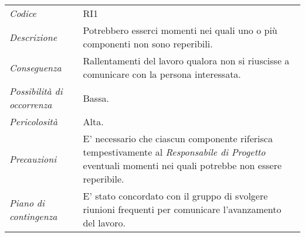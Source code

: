 {{{{{{{{{{{\def\tabularxcolumn#1{m{#1}}
{

	\begin{center}
		\renewcommand{\arraystretch}{1.4}

		\begin{longtable}{|p{5cm}|p{12cm}|}
			\hline
			\rowcolor{airforceblue}
			\multicolumn{2}{|c|}{\textit{Comunicazione interna}}\\
			\hline
			\textit{Codice} & RI1 \\
			\hline
			\textit{Descrizione} & Potrebbero esserci momenti nei quali uno o più componenti non sono reperibili. \\
			\hline
			\textit{Conseguenza} & Rallentamenti del lavoro qualora non si riuscisse a comunicare con la persona interessata. \\
			\hline
			\textit{Possibilità di occorrenza} & Bassa. \\
			\hline
			\textit{Pericolosità} & Alta. \\
			\hline
			\textit{Precauzioni} & E' necessario che ciascun componente riferisca tempestivamente al \textit{Responsabile di Progetto} eventuali momenti nei quali potrebbe non essere reperibile. \\
			\hline
			\textit{Piano di contingenza} & E' stato concordato con il gruppo di svolgere riunioni frequenti per comunicare l'avanzamento del lavoro.\\
			\hline
		\end{longtable}
	\end{center}

\def\tabularxcolumn#1{m{#1}}
{
	
	\begin{center}
		\renewcommand{\arraystretch}{1.4}
		

\end{center}}}}}}}}}}}}}}
